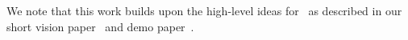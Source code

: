 We note that this work builds upon the high-level ideas for \SeeDB\ as 
described in our short vision paper~\cite{DBLP:conf/vldb/Parameswaran2013} and 
demo paper~\cite{DBLP:journals/pvldb/VartakMPP14}.


